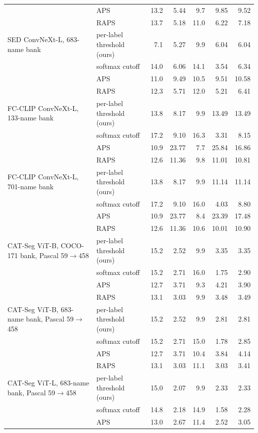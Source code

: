 \begin{tabular}{@{}llrrrrr@{}}
 & APS & 13.2 & 5.44 & 9.7 & 9.85 & 9.52 \\
 & RAPS & 13.7 & 5.18 & 11.0 & 6.22 & 7.18 \\
\midrule
SED ConvNeXt-L, 683-name bank & per-label threshold (ours) & 7.1 & 5.27 & 9.9 & 6.04 & 6.04 \\
 & softmax cutoff & 14.0 & 6.06 & 14.1 & 3.54 & 6.34 \\
 & APS & 11.0 & 9.49 & 10.5 & 9.51 & 10.58 \\
 & RAPS & 12.3 & 5.71 & 12.0 & 5.21 & 6.41 \\
\midrule
FC-CLIP ConvNeXt-L, 133-name bank & per-label threshold (ours) & 13.8 & 8.17 & 9.9 & 13.49 & 13.49 \\
 & softmax cutoff & 17.2 & 9.10 & 16.3 & 3.31 & 8.15 \\
 & APS & 10.9 & 23.77 & 7.7 & 25.84 & 16.86 \\
 & RAPS & 12.6 & 11.36 & 9.8 & 11.01 & 10.81 \\
\midrule
FC-CLIP ConvNeXt-L, 701-name bank & per-label threshold (ours) & 13.8 & 8.17 & 9.9 & 11.14 & 11.14 \\
 & softmax cutoff & 17.2 & 9.10 & 16.0 & 4.03 & 8.80 \\
 & APS & 10.9 & 23.77 & 8.4 & 23.39 & 17.48 \\
 & RAPS & 12.6 & 11.36 & 10.6 & 10.01 & 10.90 \\
\midrule
CAT-Seg ViT-B, COCO-171 bank, Pascal 59$\to$458 & per-label threshold (ours) & 15.2 & 2.52 & 9.9 & 3.35 & 3.35 \\
 & softmax cutoff & 15.2 & 2.71 & 16.0 & 1.75 & 2.90 \\
 & APS & 12.7 & 3.71 & 9.3 & 4.21 & 3.90 \\
 & RAPS & 13.1 & 3.03 & 9.9 & 3.48 & 3.49 \\
\midrule
CAT-Seg ViT-B, 683-name bank, Pascal 59$\to$458 & per-label threshold (ours) & 15.2 & 2.52 & 9.9 & 2.81 & 2.81 \\
 & softmax cutoff & 15.2 & 2.71 & 15.0 & 1.78 & 2.85 \\
 & APS & 12.7 & 3.71 & 10.4 & 3.84 & 4.14 \\
 & RAPS & 13.1 & 3.03 & 11.1 & 3.03 & 3.41 \\
\midrule
CAT-Seg ViT-L, 683-name bank, Pascal 59$\to$458 & per-label threshold (ours) & 15.0 & 2.07 & 9.9 & 2.33 & 2.33 \\
 & softmax cutoff & 14.8 & 2.18 & 14.9 & 1.58 & 2.28 \\
 & APS & 13.0 & 2.67 & 11.4 & 2.52 & 3.05 \\

\end{tabular}
